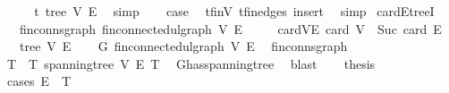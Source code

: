 \begin{isabellebody}
\ \ \isamarkupfalse%
\ \isamarkupfalse%
\ t{\isacharprime}{\kern0pt}{\isacharcolon}{\kern0pt}\ tree\ V{\isacharprime}{\kern0pt}\ E{\isacharprime}{\kern0pt}\ \isamarkupfalse%
\ simp\isanewline
\ \ \isamarkupfalse%
\ {\isacharquery}{\kern0pt}case\ \isamarkupfalse%
\ t{\isacharprime}{\kern0pt}{\isachardot}{\kern0pt}finV\ t{\isacharprime}{\kern0pt}{\isachardot}{\kern0pt}fin{\isacharunderscore}{\kern0pt}edges\ insert\ \isamarkupfalse%
\ simp\isanewline
{}\isamarkupfalse%
%
\endisatagproof
{\isafoldproof}%
%
\isadelimproof
\isanewline
%
\endisadelimproof
\isanewline
{}\isamarkupfalse%
\isanewline
\isanewline
{}\isamarkupfalse%
\ card{\isacharunderscore}{\kern0pt}E{\isacharunderscore}{\kern0pt}treeI{\isacharcolon}{\kern0pt}\isanewline
\ \ \ fin{\isacharunderscore}{\kern0pt}conn{\isacharunderscore}{\kern0pt}sgraph{\isacharcolon}{\kern0pt}\ {\isachardoublequoteopen}fin{\isacharunderscore}{\kern0pt}connected{\isacharunderscore}{\kern0pt}ulgraph\ V\ E{\isachardoublequoteclose}\isanewline
\ \ \ \ \ card{\isacharunderscore}{\kern0pt}V{\isacharunderscore}{\kern0pt}E{\isacharcolon}{\kern0pt}\ {\isachardoublequoteopen}card\ V\ {\isacharequal}{\kern0pt}\ Suc\ {\isacharparenleft}{\kern0pt}card\ E{\isacharparenright}{\kern0pt}{\isachardoublequoteclose}\isanewline
\ \ \ {\isachardoublequoteopen}tree\ V\ E{\isachardoublequoteclose}\isanewline
%
\isadelimproof
%
\endisadelimproof
%
\isatagproof
{}\isamarkupfalse%
{\isacharminus}{\kern0pt}\isanewline
\ \ \isamarkupfalse%
\ G{\isacharcolon}{\kern0pt}\ fin{\isacharunderscore}{\kern0pt}connected{\isacharunderscore}{\kern0pt}ulgraph\ V\ E\ \isamarkupfalse%
\ fin{\isacharunderscore}{\kern0pt}conn{\isacharunderscore}{\kern0pt}sgraph\ \isacommand{{\isachardot}{\kern0pt}}\isamarkupfalse%
\isanewline
\ \ \isamarkupfalse%
\ T\ \ T{\isacharcolon}{\kern0pt}\ {\isachardoublequoteopen}spanning{\isacharunderscore}{\kern0pt}tree\ V\ E\ T{\isachardoublequoteclose}\ \isamarkupfalse%
\ G{\isachardot}{\kern0pt}has{\isacharunderscore}{\kern0pt}spanning{\isacharunderscore}{\kern0pt}tree\ \isamarkupfalse%
\ blast\isanewline
\ \ \isamarkupfalse%
\ {\isacharquery}{\kern0pt}thesis\isanewline
\ \ \isamarkupfalse%
\ {\isacharparenleft}{\kern0pt}cases\ {\isachardoublequoteopen}E\ {\isacharequal}{\kern0pt}\ T{\isachardoublequoteclose}{\isacharparenright}{\kern0pt}\isanewline

\end{isabellebody}
